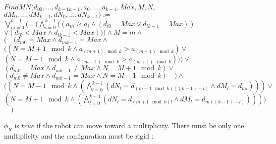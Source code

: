 \documentclass{article}
\begin{document}
\begin{center}

$FindMN(d_{00}, \ldots ,d_{k-1k-1}, a_{0}, \ldots , a_{k-1}, Max, M, N,$\\
$ dM_{0}, \dots, dM_{k-1}, dN_{0}, \dots, dN_{k-1}):=$\\
$\bigvee_{m=0}^{k-1}(\quad
(\bigwedge_{i=0}^{k-1} ((a_{m} \geq a_i \land (d_{i0} = Max \lor d_{ik-1} = Max))$\\
$\lor (d_{i0} < Max \land d_{ik-1} < Max))) \land M = m \land $\\ 
$(\quad (
d_{m0} = Max \land d_{mk-1} = Max \land $\\
$( ( N = M+1 \mod k \land a_{(m+1) \mod{k}} > a_{(m-1) \mod{k}}) \lor $\\
$( N = M-1 \mod{k} \land a_{(m-1) \mod{k}} > a_{(m+1) \mod{k}}))
)\lor $\\
$(
d_{m0} = Max \land d_{mk-1} \not= Max \land N = M+1 \mod k
) \lor$\\
$(
d_{m0} \not= Max \land d_{mk-1} = Max \land N = M-1 \mod{k}
)\quad ) \land $\\
$( (N = M-1\mod{k} \land (\bigwedge_{l = 0}^{k-1} (dN_{l} = d_{(m-1 \mod{k}) ((k-1)-l)} \land dM_{l} = d_{ml}) ) ) \lor $\\
$(N = M+1\mod{k} \land (\bigwedge_{l = 0}^{k-1} (dN_{l} = d_{(m+1 \mod{k})l} \land dM_{l} = d_{m((k-1)-l)}) ) ) )$
$\quad )$
\end{center}

$\phi_R$ is $true$ if the robot can move toward a multiplicity. There must be only one multiplicity and the configuration must be rigid :
\end{document}

